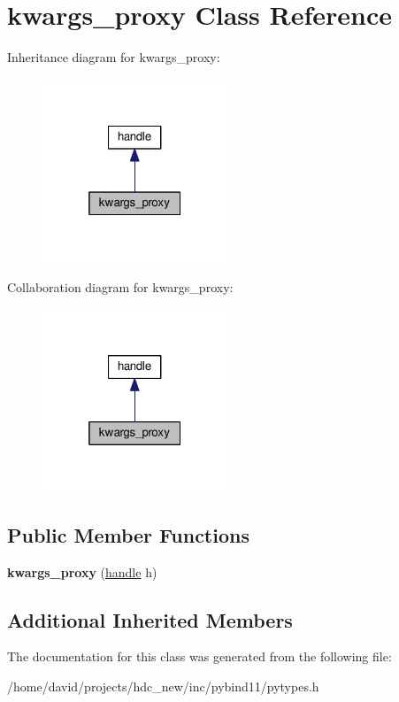 \hypertarget{classkwargs__proxy}{}\section{kwargs\+\_\+proxy Class Reference}
\label{classkwargs__proxy}


Inheritance diagram for kwargs\+\_\+proxy\+:
\nopagebreak
\begin{figure}[H]
\begin{center}
\leavevmode
\includegraphics[width=157pt]{classkwargs__proxy__inherit__graph}
\end{center}
\end{figure}


Collaboration diagram for kwargs\+\_\+proxy\+:
\nopagebreak
\begin{figure}[H]
\begin{center}
\leavevmode
\includegraphics[width=157pt]{classkwargs__proxy__coll__graph}
\end{center}
\end{figure}
\subsection*{Public Member Functions}
\begin{DoxyCompactItemize}
\item 
{\bfseries kwargs\+\_\+proxy} (\hyperlink{classhandle}{handle} h)\hypertarget{classkwargs__proxy_a365362a83bba30bd75f8bc610dd93563}{}\label{classkwargs__proxy_a365362a83bba30bd75f8bc610dd93563}

\end{DoxyCompactItemize}
\subsection*{Additional Inherited Members}


The documentation for this class was generated from the following file\+:\begin{DoxyCompactItemize}
\item 
/home/david/projects/hdc\+\_\+new/inc/pybind11/pytypes.\+h\end{DoxyCompactItemize}
